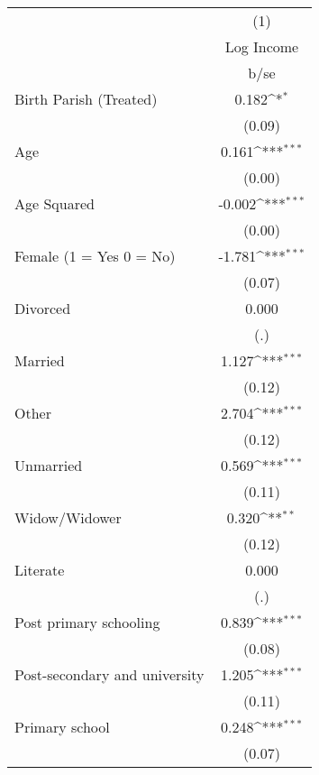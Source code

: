 {
\def\sym#1{\ifmmode^{#1}\else\(^{#1}\)\fi}
\begin{tabular}{l*{1}{c}}
\hline\hline
                    &\multicolumn{1}{c}{(1)}\\
                    &\multicolumn{1}{c}{Log Income}\\
                    &        b/se         \\
\hline
Birth Parish (Treated)&       0.182\sym{*}  \\
                    &      (0.09)         \\
Age                 &       0.161\sym{***}\\
                    &      (0.00)         \\
Age Squared         &      -0.002\sym{***}\\
                    &      (0.00)         \\
Female (1 = Yes 0 = No)&      -1.781\sym{***}\\
                    &      (0.07)         \\
Divorced            &       0.000         \\
                    &         (.)         \\
Married             &       1.127\sym{***}\\
                    &      (0.12)         \\
Other               &       2.704\sym{***}\\
                    &      (0.12)         \\
Unmarried           &       0.569\sym{***}\\
                    &      (0.11)         \\
Widow/Widower       &       0.320\sym{**} \\
                    &      (0.12)         \\
Literate            &       0.000         \\
                    &         (.)         \\
Post primary schooling&       0.839\sym{***}\\
                    &      (0.08)         \\
Post-secondary and university&       1.205\sym{***}\\
                    &      (0.11)         \\
Primary school      &       0.248\sym{***}\\
                    &      (0.07)         \\

\end{tabular}}
